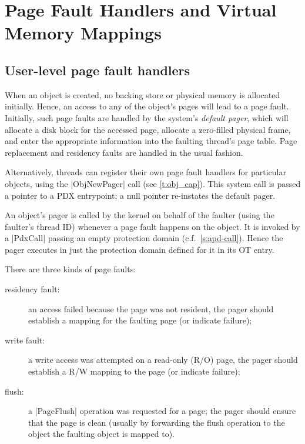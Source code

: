 \documentclass[a4paper,11pt,twoside,dvips]{report}
\begin{document}
\chapter{\label{s:page}Page Fault Handlers and Virtual Memory Mappings}


\section{\label{s:ulp}User-level page fault handlers}

When an object is created, no backing store or physical memory is
allocated initially. Hence, an access to any of the object's pages will
lead to a page fault. Initially, such page faults are handled by the
system's \emph{default pager}, which will allocate a disk block for the
accessed page, allocate a zero-filled physical frame, and enter the
appropriate information into the faulting thread's page table. Page
replacement and residency faults are handled in the usual fashion.

\begin{sloppypar}
Alternatively, threads can register their own page fault handlers for
particular objects, using the |ObjNewPager| call (see
\autoref{t:obj_cap}). This system call is passed a pointer to a PDX
entrypoint; a null pointer re-instates the default pager.
\end{sloppypar}

An object's pager is called by the kernel on behalf of the faulter
(using the faulter's thread ID) whenever a page fault happens on the
object. It is invoked by a |PdxCall| passing an empty protection domain
(c.f.\ \autoref{s:apd-call}). Hence the pager executes in just the
protection domain defined for it in its OT entry.


There are three kinds of page faults:
\begin{description}
\item[residency fault:] an access failed because the page was not
resident, the pager should establish a mapping for the faulting page (or
indicate failure);
\item[write fault:] a write access was attempted on a read-only (R/O)
page, the pager should establish a R/W mapping to the page (or indicate
failure);
\item[flush:] a |PageFlush| operation was requested for a page; the
pager should ensure that the page is clean (usually by forwarding the
flush operation to the object the faulting object is mapped to).
\end{description}
\end{document}
